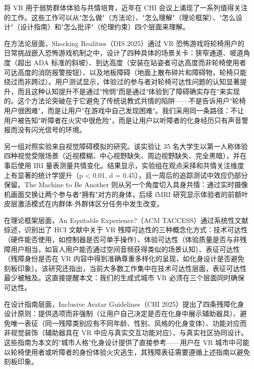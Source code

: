 将 VR 用于弱势群体体验与共情培育，近年在 CHI 会议上涌现了一系列值得关注的工作。这些工作可以从"怎么做"（方法论）、"怎么理解"（理论框架）、"怎么设计"（设计指南）和"怎么批评"（伦理约束）四个层面来理解。

在方法论层面，Shocking Realities（DIS 2025）通过 VR 恐怖游戏将轮椅用户的日常挑战嵌入恐怖游戏机制之中，设计了四种具体的场景关卡：狭窄通道、坡道角度（超出 ADA 标准的斜坡）、到达高度（安装在站姿者可达高度而非轮椅使用者可达高度的消防报警按钮）、以及地板障碍（地面上散布碎片和障碍物，轮椅只能绕过而非跨过）。用户测试显示，体验过的参与者对轮椅可达性问题的认知显著提升，而且这种认知提升不是通过"怜悯"而是通过"体验到了障碍确实存在"来实现的\cite{shockingrealities2025}。这个方法论突破在于它避免了传统说教式共情的陷阱——不是告诉用户"轮椅用户很困难"，而是让用户"在游戏中自己发现困难"。我们采用同一条路径：不让用户被告知"听障者在火灾中很危险"，而是让用户以听障者的化身经历只有声音警报而没有闪光信号的环境。

另一组对照实验来自视觉障碍模拟的研究。该实验让 35 名大学生以第一人称体验四种视觉受限场景（近视模糊、中心视野缺失、周边视野缺失、完全黑暗），并在事后使用 IRI 量表测量共情变化。结果显示，实验组在观点采择和共情关注维度上有显著的统计学提升（p < 0.01, d = 0.45），且一周后的追踪测试中效应仍部分保留\cite{visualimpairment2025}。The Machine to Be Another 则从另一个角度切入具身共情：通过实时摄像机画面交换让两个参与者"拥有"对方的身体，后续 fMRI 研究显示体验者的前额叶皮层激活模式在内群体-外群体区分任务中发生改变\cite{machinetobeanother}。

在理论框架层面，An Equitable Experience?（ACM TACCESS）通过系统性文献综述，识别出了 HCI 文献中关于 VR 残障可达性的三种概念化方式：技术可达性（硬件能否使用，如控制器是否可单手操作）、体验可达性（体验质量是否与非残障用户相当，如盲人用户能否通过空间音频获得类似的场景认知）、表征可达性（残障身份是否在 VR 内容中得到准确尊重多样化的呈现，如化身设计是否避免刻板印象）。该研究还指出，当前大多数工作集中在技术可达性层面，表征可达性最少被触及\cite{equitable2025}。这直接提醒本文：我们的生成式城市 VR 必须在三个层面同时确保可达性。

在设计指南层面，Inclusive Avatar Guidelines（CHI 2025）提出了四条残障化身设计原则：提供选项而非强制（让用户自己决定是否在化身中展示辅助器具）、避免唯一表征（同一残障类别应有不同年龄、性别、风格的化身变体）、功能对应而非视觉装饰（辅助器具在 VR 中应与真实交互功能对应）、与真实社区协同设计\cite{inclusiveavatar2025}。这些指南为本文的"城市人格"化身设计提供了直接参考——用户在 VR 城市中可能以轮椅使用者或听障者的身份体验火灾逃生，其残障表征需要遵循上述指南以避免刻板印象。


